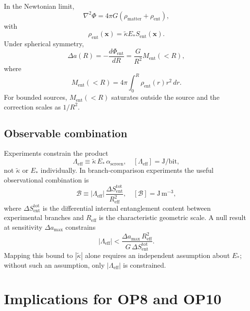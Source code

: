\documentclass[11pt]{article}
\begin{document}
In the Newtonian limit,
\begin{equation}
\nabla^2 \Phi = 4\pi G\left(\rho_{\mathrm{matter}} + \rho_{\mathrm{ent}}\right),
\end{equation}
with
\begin{equation}
\rho_{\mathrm{ent}}(\mathbf{x}) = \tilde{\kappa} E_* S_{\mathrm{ent}}(\mathbf{x}).
\end{equation}
Under spherical symmetry,
\begin{equation}
\Delta a(R) = -\frac{d\Phi_{\mathrm{ent}}}{dR} = \frac{G}{R^2}M_{\mathrm{ent}}(<R),
\end{equation}
where
\begin{equation}
M_{\mathrm{ent}}(<R) = 4\pi\int_0^R \rho_{\mathrm{ent}}(r)r^2\,dr.
\end{equation}
For bounded sources, $M_{\mathrm{ent}}(<R)$ saturates outside the source and the correction scales as $1/R^2$.

\subsection{Observable combination}

Experiments constrain the product
\begin{equation}
\Lambda_{\mathrm{eff}} \equiv \tilde{\kappa}\,E_*\,\alpha_{\mathrm{screen}},
\quad [\Lambda_{\mathrm{eff}}] = \mathrm{J/bit},
\end{equation}
not $\tilde{\kappa}$ or $E_*$ individually. In branch-comparison experiments the
useful observational combination is
\begin{equation}
\mathcal{B}
\equiv |\Lambda_{\mathrm{eff}}|\,\frac{\Delta S_{\mathrm{ent}}^{\mathrm{tot}}}{R_{\mathrm{eff}}^2},
\quad [\mathcal{B}] = \mathrm{J\,m^{-3}},
\end{equation}
where $\Delta S_{\mathrm{ent}}^{\mathrm{tot}}$ is the differential internal entanglement content between
experimental branches and $R_{\mathrm{eff}}$ is the characteristic geometric scale. A null result
at sensitivity $\Delta a_{\max}$ constrains
\begin{equation}
|\Lambda_{\mathrm{eff}}| < \frac{\Delta a_{\max}\,R_{\mathrm{eff}}^2}{G\,\Delta S_{\mathrm{ent}}^{\mathrm{tot}}}.
\end{equation}
Mapping this bound to $|\tilde{\kappa}|$ alone requires an independent assumption about
$E_*$; without such an assumption, only $|\Lambda_{\mathrm{eff}}|$ is constrained.

\section{Implications for OP8 and OP10}
\end{document}
